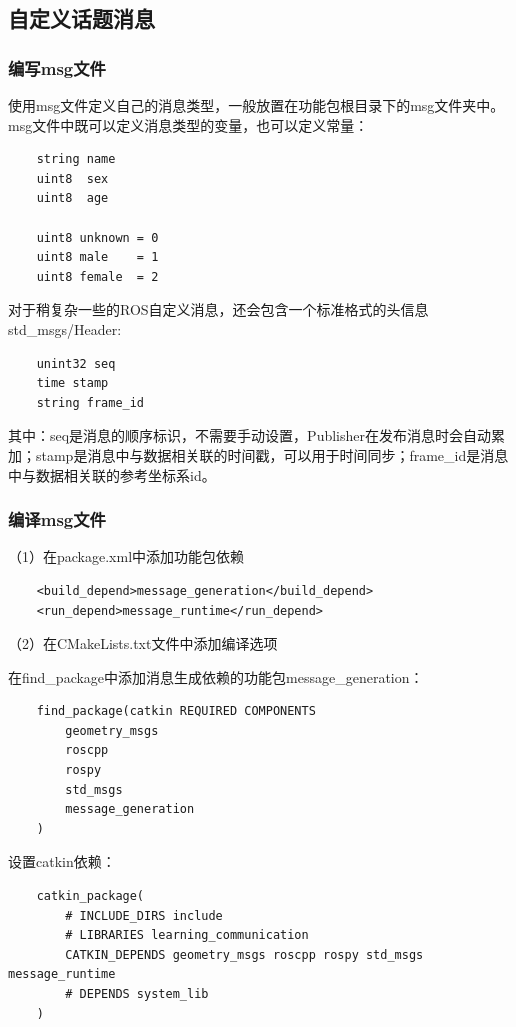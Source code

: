 \documentclass[10pt, oneside]{book}
\begin{document}
\subsection{自定义话题消息}

\subsubsection{编写msg文件}

使用msg文件定义自己的消息类型，一般放置在功能包根目录下的msg文件夹中。msg文件中既可以定义消息类型的变量，也可以定义常量：

\begin{verbatim}
    string name
    uint8  sex
    uint8  age
    
    uint8 unknown = 0
    uint8 male    = 1
    uint8 female  = 2
\end{verbatim}

对于稍复杂一些的ROS自定义消息，还会包含一个标准格式的头信息std\_msgs/Header:
\begin{verbatim}
    unint32 seq
    time stamp
    string frame_id  
\end{verbatim}

其中：seq是消息的顺序标识，不需要手动设置，Publisher在发布消息时会自动累加；stamp是消息中与数据相关联的时间戳，可以用于时间同步；frame\_id是消息中与数据相关联的参考坐标系id。

\subsubsection{编译msg文件}

（1）在package.xml中添加功能包依赖

\begin{verbatim}
    <build_depend>message_generation</build_depend>
    <run_depend>message_runtime</run_depend>
\end{verbatim}

（2）在CMakeLists.txt文件中添加编译选项

在find\_package中添加消息生成依赖的功能包message\_generation：
\begin{verbatim}
    find_package(catkin REQUIRED COMPONENTS
        geometry_msgs
        roscpp
        rospy
        std_msgs
        message_generation
    )
\end{verbatim}

设置catkin依赖：
\begin{verbatim}
    catkin_package(
        # INCLUDE_DIRS include
        # LIBRARIES learning_communication
        CATKIN_DEPENDS geometry_msgs roscpp rospy std_msgs message_runtime
        # DEPENDS system_lib
    )
\end{verbatim}
\end{document}
